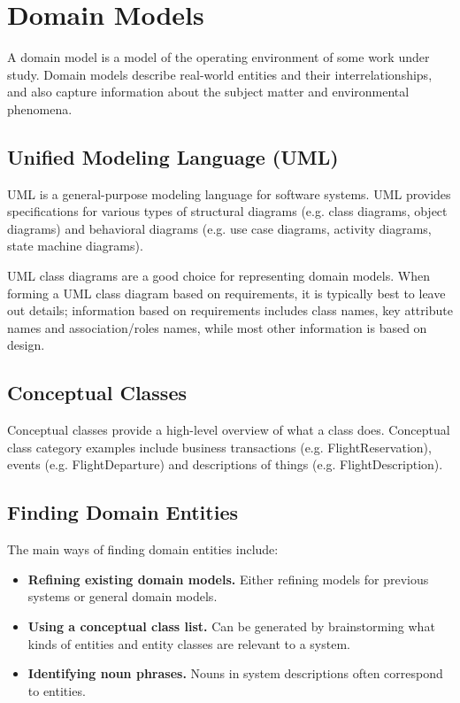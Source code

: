 \documentclass[12pt,titlepage]{article}
\let\stdsection\section
\renewcommand\section{\clearpage\stdsection}
\begin{document}
  \section{Domain Models}
    A domain model is a model of the operating environment of some work under study. Domain models describe real-world entities and their interrelationships, and also capture
    information about the subject matter and environmental phenomena.

    \subsection{Unified Modeling Language (UML)}
      UML is a general-purpose modeling language for software systems. UML provides specifications for various types of structural diagrams (e.g. class diagrams, object diagrams)
      and behavioral diagrams (e.g. use case diagrams, activity diagrams, state machine diagrams).
      
      UML class diagrams are a good choice for representing domain models. When forming a UML class diagram based on requirements, it is typically best to leave out details;
      information based on requirements includes class names, key attribute names and association/roles names, while most other information is based on design.

    \subsection{Conceptual Classes}
      Conceptual classes provide a high-level overview of what a class does. Conceptual class category examples include business transactions (e.g. FlightReservation), events
      (e.g. FlightDeparture) and descriptions of things (e.g. FlightDescription).

    \subsection{Finding Domain Entities}
      The main ways of finding domain entities include:
      \begin{itemize}
        \item \textbf{Refining existing domain models.} Either refining models for previous systems or general domain models.
        \item \textbf{Using a conceptual class list.} Can be generated by brainstorming what kinds of entities and entity classes are relevant to a system.
        \item \textbf{Identifying noun phrases.} Nouns in system descriptions often correspond to entities.
      \end{itemize}
\end{document}
